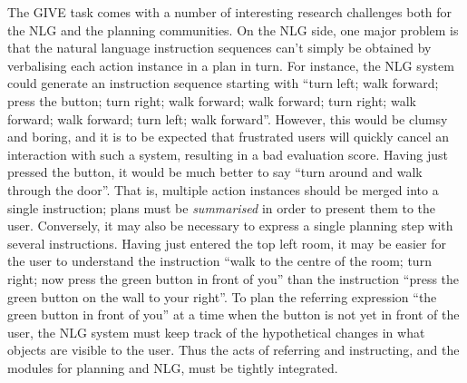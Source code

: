The GIVE task comes with a number of interesting research challenges
both for the NLG and the planning communities.  On the NLG side, one
major problem is that the natural language instruction sequences can't
simply be obtained by verbalising each action instance in a plan in
turn.  For instance, the NLG system could generate an instruction
sequence starting with ``turn left; walk forward; press the button;
turn right; walk forward; walk forward; turn right; walk forward; walk
forward; turn left; walk forward''.  However, this would be clumsy and
boring, and it is to be expected that frustrated users will quickly
cancel an interaction with such a system, resulting in a bad
evaluation score.  Having just pressed the button, it would be much
better to say ``turn around and walk through the door''. That is,
multiple action instances should be merged into a single instruction;
plans must be \emph{summarised} in order to present them to the
user. Conversely, it may also be necessary to express a single
planning step with several instructions.  Having just entered the top
left room, it may be easier for the user to understand the instruction
``walk to the centre of the room; turn right; now press the green
button in front of you'' than the instruction ``press the green button
on the wall to your right''.  To plan the referring expression ``the
green button in front of you'' at a time when the button is not yet in
front of the user, the NLG system must keep track of the hypothetical
changes in what objects are visible to the user.  Thus the acts of
referring and instructing, and the modules for planning and NLG, must
be tightly integrated.

